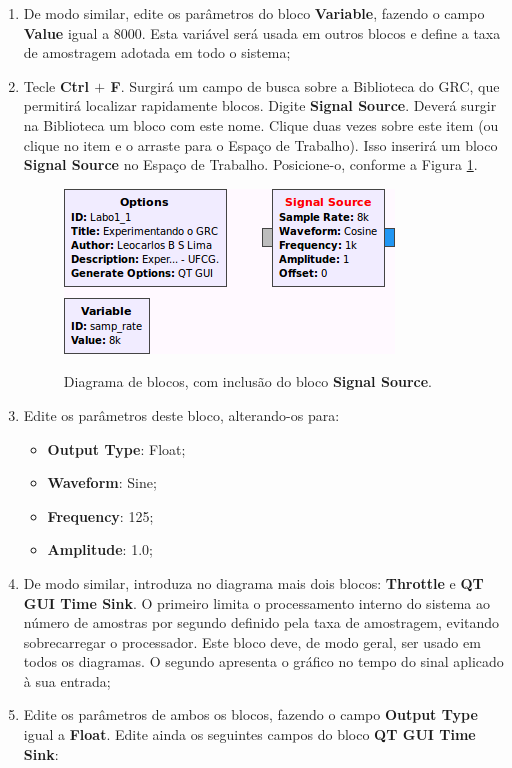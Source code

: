 \documentclass[12pt,addpoints]{exam}
\newcommand{\myscale}{0.4}
\begin{document}
\begin{enumerate}
    \item De modo similar, edite os parâmetros do bloco \textbf{Variable}, fazendo o campo \textbf{Value} igual a 8000. Esta variável será usada em outros blocos e define a taxa de amostragem adotada em todo o sistema;
    \item Tecle \textbf{Ctrl $+$ F}. Surgirá um campo de busca sobre a Biblioteca do GRC, que permitirá localizar rapidamente blocos. Digite \textbf{Signal Source}. Deverá surgir na Biblioteca um bloco com este nome. Clique duas vezes sobre este item (ou clique no item e o arraste para o Espaço de Trabalho). Isso inserirá um bloco \textbf{Signal Source} no Espaço de Trabalho. Posicione-o, conforme a Figura \ref{fig:GRC_1-1c}.
    \begin{figure}[htb]
        \centering
        \includegraphics[scale=\myscale]{./Figuras/GRC_1-1c} \\
        \caption{Diagrama de blocos, com inclusão do bloco \textbf{Signal Source}.} 
        \label{fig:GRC_1-1c}
    \end{figure}
    \item Edite os parâmetros deste bloco, alterando-os para:
    \begin{itemize}
        \item \textbf{Output Type}: Float;
        \item \textbf{Waveform}: Sine;
        \item \textbf{Frequency}: 125;
        \item \textbf{Amplitude}: 1.0;
    \end{itemize}
    \item De modo similar, introduza no diagrama mais dois blocos: \textbf{Throttle} e \textbf{QT GUI Time Sink}. O primeiro limita o processamento interno do sistema ao número de amostras por segundo definido pela taxa de amostragem, evitando sobrecarregar o processador. Este bloco deve, de modo geral, ser usado em todos os diagramas. O segundo apresenta o gráfico no tempo do sinal aplicado à sua entrada;
    \item Edite os parâmetros de ambos os blocos, fazendo o campo \textbf{Output Type} igual a \textbf{Float}. Edite ainda os seguintes campos do bloco \textbf{QT GUI Time Sink}:

\end{enumerate}
\end{document}
